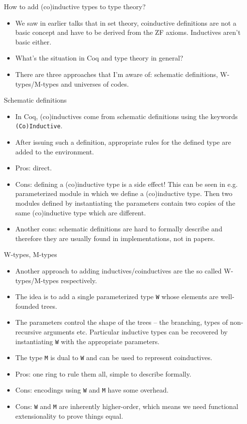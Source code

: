 \documentclass{beamer}
\begin{document}
\begin{frame}{How to add (co)inductive types to type theory?}
\begin{itemize}
	\item We saw in earlier talks that in set theory, coinductive definitions are not a basic concept and have to be derived from the ZF axioms. Inductives aren't basic either.
	\item What's the situation in Coq and type theory in general?
	\item There are three approaches that I'm aware of: schematic definitions, W-types/M-types and universes of codes.
\end{itemize}
\end{frame}

\begin{frame}{Schematic definitions}
\begin{itemize}
	\item In Coq, (co)inductives come from schematic definitions using the keywords \texttt{(Co)Inductive}.
	\item After issuing such a definition, appropriate rules for the defined type are added to the environment.
	\item Pros: direct.
	\item Cons: defining a (co)inductive type is a side effect! This can be seen in e.g. parameterized module in which we define a (co)inductive type. Then two modules defined by instantiating the parameters contain two copies of the same (co)inductive type which are different.
	\item Another cons: schematic definitions are hard to formally describe and therefore they are usually found in implementations, not in papers.
\end{itemize}
\end{frame}

\begin{frame}{W-types, M-types}
\begin{itemize}
	\item Another approach to adding inductives/coinductives are the so called W-types/M-types respectively.
	\item The idea is to add a single parameterized type \texttt{W} whose elements are well-founded trees.
	\item The parameters control the shape of the trees -- the branching, types of non-recursive arguments etc. Particular inductive types can be recovered by instantiating \texttt{W} with the appropriate parameters.
	\item The type \texttt{M} is dual to \texttt{W} and can be used to represent coinductives.
	\item Pros: one ring to rule them all, simple to describe formally.
	\item Cons: encodings using \texttt{W} and \texttt{M} have some overhead.
	\item Cons: \texttt{W} and \texttt{M} are inherently higher-order, which means we need functional extensionality to prove things equal.
\end{itemize}
\end{frame}
\end{document}
